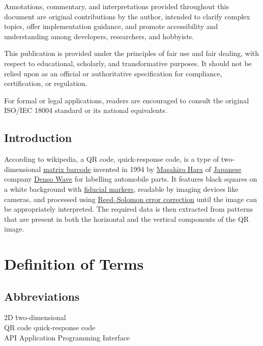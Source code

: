 Annotations, commentary, and interpretations provided throughout this document are original contributions by the author, intended to clarify complex topics, offer implementation guidance, and promote accessibility and understanding among developers, researchers, and hobbyists.

This publication is provided under the principles of fair use and fair dealing, with respect to educational, scholarly, and transformative purposes. It should not be relied upon as an official or authoritative specification for compliance, certification, or regulation.

For formal or legal applications, readers are encouraged to consult the original ISO/IEC 18004 standard or its national equivalents.

\subsection{Introduction}

According to wikipedia, a QR code, quick-response code, is a type of two-dimensional
\href{https://en.wikipedia.org/wiki/Barcode\#Matrix_(2D)_codes}{matrix
barcode} invented in 1994 by
\href{https://en.wikipedia.org/wiki/Masahiro_Hara}{Masahiro Hara} of
\href{https://en.wikipedia.org/wiki/Japan}{Japanese} company
\href{https://en.wikipedia.org/wiki/Denso\#DENSO_Wave}{Denso Wave} for
labelling automobile parts. It features black squares on a white
background with
\href{https://en.wikipedia.org/wiki/Fiducial_markers}{fiducial markers},
readable by imaging devices like cameras, and processed using
\href{https://en.wikipedia.org/wiki/Reed\%E2\%80\%93Solomon_error_correction}{Reed--Solomon
error correction} until the image can be appropriately interpreted. The
required data is then extracted from patterns that are present in both
the horizontal and the vertical components of the QR image.\cite{wikipedia-qr}

\mainmatter

\section{Definition of Terms}

\subsection{Abbreviations}

\begin{tabbing}
  2D \hspace{3em} \= two-dimensional \cite{mw-2d} \\
  QR code \> quick-response code \cite{wikipedia-qr} \\
  API \> Application Programming Interface \cite{wikipedia-api} \\
\end{tabbing}

